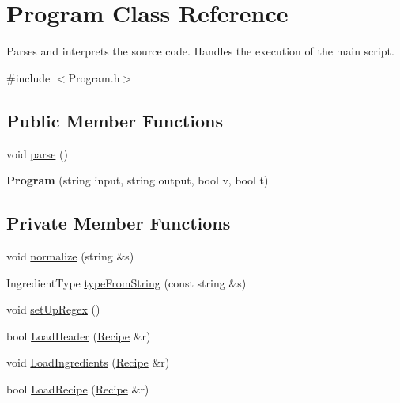 \hypertarget{classProgram}{\section{Program Class Reference}
\label{classProgram}
}


Parses and interprets the source code. Handles the execution of the main script.  




{\ttfamily \#include $<$Program.\-h$>$}

\subsection*{Public Member Functions}
\begin{DoxyCompactItemize}
\item 
void \hyperlink{classProgram_a7e845a6184bade97aead63d2e14c5040}{parse} ()
\item 
\hypertarget{classProgram_aee67cabb04f36e7e0f059c1976d55601}{{\bfseries Program} (string input, string output, bool v, bool t)}\label{classProgram_aee67cabb04f36e7e0f059c1976d55601}

\end{DoxyCompactItemize}
\subsection*{Private Member Functions}
\begin{DoxyCompactItemize}
\item 
void \hyperlink{classProgram_ad5a95ba2b5f9caa0555d7d24c475f502}{normalize} (string \&s)
\item 
Ingredient\-Type \hyperlink{classProgram_aa97b3ca0f048f04847e6be90581cf756}{type\-From\-String} (const string \&s)
\item 
void \hyperlink{classProgram_a20fc155df19b3cfc73901e31f2fad53d}{set\-Up\-Regex} ()
\item 
bool \hyperlink{classProgram_a4e8ea37034e515f7c21d3fb3cc119765}{Load\-Header} (\hyperlink{classRecipe}{Recipe} \&r)
\item 
void \hyperlink{classProgram_a277650f0e2ae017e8171aee4fbde0ae2}{Load\-Ingredients} (\hyperlink{classRecipe}{Recipe} \&r)
\item 
bool \hyperlink{classProgram_a28d7594324677db5e10aff47fa97f593}{Load\-Recipe} (\hyperlink{classRecipe}{Recipe} \&r)
\end{DoxyCompactItemize}
